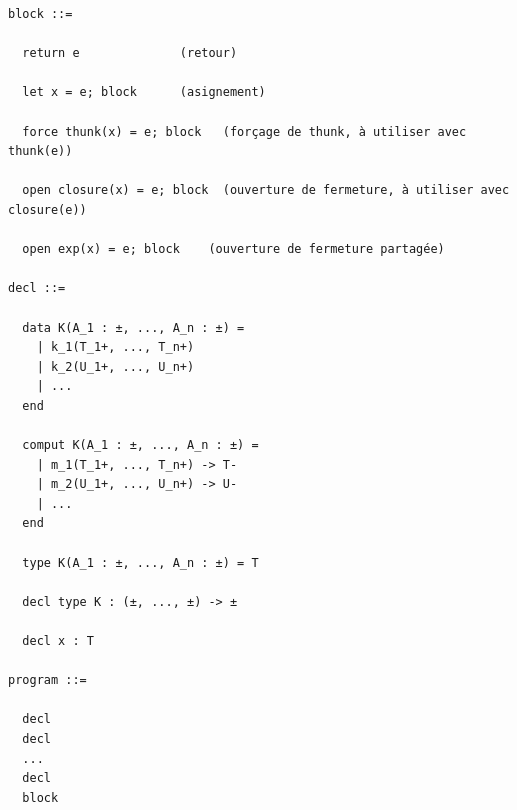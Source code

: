 \documentclass[12pt]{article}
\begin{document}
\begin{verbatim}
block ::= 
  
  return e              (retour)
  
  let x = e; block      (asignement)
  
  force thunk(x) = e; block   (forçage de thunk, à utiliser avec thunk(e)) 
  
  open closure(x) = e; block  (ouverture de fermeture, à utiliser avec closure(e))

  open exp(x) = e; block    (ouverture de fermeture partagée)
  
decl ::=
 
  data K(A_1 : ±, ..., A_n : ±) = 
    | k_1(T_1+, ..., T_n+)
    | k_2(U_1+, ..., U_n+)
    | ...
  end
     
  comput K(A_1 : ±, ..., A_n : ±) = 
    | m_1(T_1+, ..., T_n+) -> T-
    | m_2(U_1+, ..., U_n+) -> U-
    | ... 
  end
   
  type K(A_1 : ±, ..., A_n : ±) = T
     
  decl type K : (±, ..., ±) -> ±

  decl x : T

program ::=

  decl 
  decl
  ...
  decl
  block 
\end{verbatim}
\end{document}
